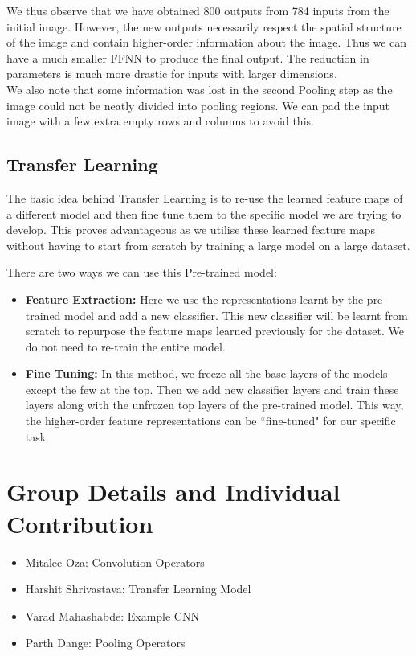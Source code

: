 \documentclass[11pt, twosides]{article}
\begin{document}
We thus observe that we have obtained 800 outputs from 784 inputs from the initial image. However, the new outputs necessarily respect the spatial structure of the image and contain higher-order information about the image. Thus we can have a much smaller FFNN to produce the final output. The reduction in parameters is much more drastic for inputs with larger dimensions. \\
We also note that some information was lost in the second Pooling step as the image could not be neatly divided into pooling regions. We can pad the input image with a few extra empty rows and columns to avoid this.
\subsection{Transfer Learning}

The basic idea behind Transfer Learning is to re-use the learned feature maps of a different model and then fine tune them to the specific model we are trying to develop. This proves advantageous as we utilise these learned feature maps without having to start from scratch by training a large model on a large dataset. 

There are two ways we can use this Pre-trained model:
\begin{itemize}
    \item \textbf{Feature Extraction:} Here we use the representations learnt by the pre-trained model and add a new classifier. This new classifier will be learnt from scratch to repurpose the feature maps learned previously for the dataset. We do not need to re-train the entire model.
    \item \textbf{Fine Tuning:} In this method, we freeze all the base layers of the models except the few at the top. Then we add new classifier layers and train these layers along with the unfrozen top layers of the pre-trained model. This way, the higher-order feature representations can be ``fine-tuned" for our specific task
\end{itemize}

\section{Group Details and Individual Contribution}

\begin{itemize}
    \item Mitalee Oza: Convolution Operators
    \item Harshit Shrivastava: Transfer Learning Model
    \item Varad Mahashabde: Example CNN
    \item Parth Dange: Pooling Operators
\end{itemize}
\end{document}
